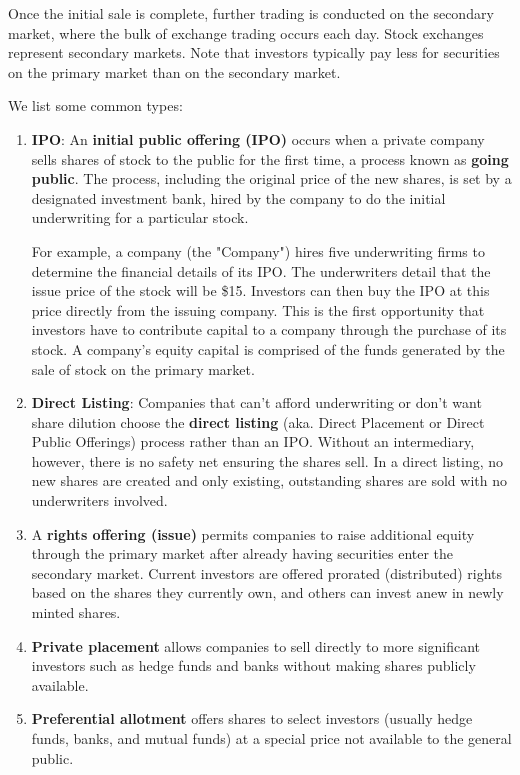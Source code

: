 \documentclass{article}
\begin{document}
    Once the initial sale is complete, further trading is conducted on the secondary market, where the bulk of exchange trading occurs each day. Stock exchanges represent secondary markets. Note that investors typically pay less for securities on the primary market than on the secondary market. 

    \begin{definition}
    We list some common types:
    \begin{enumerate}
        \item \textbf{IPO}: An \textbf{initial public offering (IPO)} occurs when a private company sells shares of stock to the public for the first time, a process known as \textbf{going public}. The process, including the original price of the new shares, is set by a designated investment bank, hired by the company to do the initial underwriting for a particular stock.

        For example, a company (the "Company") hires five underwriting firms to determine the financial details of its IPO. The underwriters detail that the issue price of the stock will be \$15. Investors can then buy the IPO at this price directly from the issuing company. This is the first opportunity that investors have to contribute capital to a company through the purchase of its stock. A company's equity capital is comprised of the funds generated by the sale of stock on the primary market.
        \item \textbf{Direct Listing}: Companies that can't afford underwriting or don't want share dilution choose the \textbf{direct listing} (aka. Direct Placement or Direct Public Offerings) process rather than an IPO. Without an intermediary, however, there is no safety net ensuring the shares sell. In a direct listing, no new shares are created and only existing, outstanding shares are sold with no underwriters involved. 
        \item A \textbf{rights offering (issue)} permits companies to raise additional equity through the primary market after already having securities enter the secondary market. Current investors are offered prorated (distributed) rights based on the shares they currently own, and others can invest anew in newly minted shares.
        \item \textbf{Private placement} allows companies to sell directly to more significant investors such as hedge funds and banks without making shares publicly available. 
        \item \textbf{Preferential allotment} offers shares to select investors (usually hedge funds, banks, and mutual funds) at a special price not available to the general public. 
    \end{enumerate}
    \end{definition}
\end{document}

